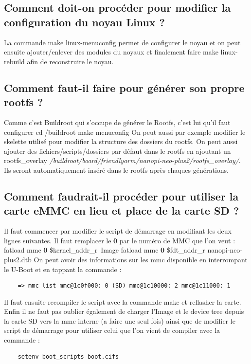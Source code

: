 \documentclass{ReportTemplate}
\begin{document}
\subsection{Comment doit-on procéder pour modifier la configuration du noyau Linux ?}
La commande make linux-menuconfig permet de configurer le noyau et on peut
ensuite ajouter/enlever des modules du noyaux et finalement faire make
linux-rebuild afin de reconstruire le noyau.
\newpage
\subsection{Comment faut-il faire pour générer son propre rootfs ?}
Comme c'est Buildroot qui s'occupe de générer le Rootfs, c'est lui qu'il faut
configurer \newline
cd /buildroot \newline
make menuconfig \newline
On peut aussi par exemple modifier le skelette utilisé pour modifier la
structure des dossiers du rootfs. On peut aussi ajouter des
fichiers/scripts/dossiers par défaut dans le rootfs en ajoutant un
rootfs\_overlay
\textit{/buildroot/board/friendlyarm/nanopi-neo-plus2/rootfs\_overlay/}. Ils
seront automatiquement inséré dans le rootfs après chaques générations.

\subsection{Comment faudrait-il procéder pour utiliser la carte eMMC en lieu et place de la carte SD ?}
Il faut commencer par modifier le script de démarrage en modifiant les deux
lignes suivantes. Il faut remplacer le \textbf{0} par le numéro de MMC que l'on
veut : \newline
 fatload mmc \textbf{0} \$kernel\_addr\_r\ Image \newline
 fatload mmc \textbf{0} \$fdt\_addr\_r nanopi-neo-plus2.dtb \newline
On peut avoir des informations sur les mmc disponible en interrompant le U-Boot
et en tappant la commande : \newline
\begin{verbatim}
    => mmc list mmc@1c0f000: 0 (SD) mmc@1c10000: 2 mmc@1c11000: 1 
\end{verbatim}

Il faut ensuite recompiler le script avec la commande make et reflasher la
carte. Enfin il ne faut pas oublier également de charger l'Image et le device
tree depuis la carte SD vers la mmc interne (a faire une seul fois) ainsi que de
modifier le script de démarrage pour utiliser celui que l'on vient de compiler
avec la commande : \newline
\begin{verbatim}
    setenv boot_scripts boot.cifs
\end{verbatim}
 
\end{document}
